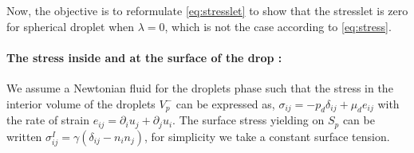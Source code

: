 \documentclass[12pt]{My_preprint}
\renewcommand{\ref}[1]{\autoref{#1}}
\begin{document}
Now, the objective is to reformulate \ref{eq:stresslet} to show that the stresslet is zero for spherical droplet when $\lambda=0$, which is not the case according to \ref{eq:stress}.



\paragraph*{The stress inside and at the surface of the drop :}

We assume a Newtonian fluid for the droplets phase such that the stress in the interior volume of the droplets $V^-_p$ can be expressed as, $\sigma_{ij} = - p_d \delta_{ij} + \mu_d e_{ij}$ with the rate of strain $e_{ij} = \partial_i u_j + \partial_j u_i$. 
The surface stress yielding on $S_p$ can be written $\sigma^I_{ij} = \gamma (\delta_{ij} - n_in_j)$, for simplicity we take a constant surface tension. 
\end{document}
